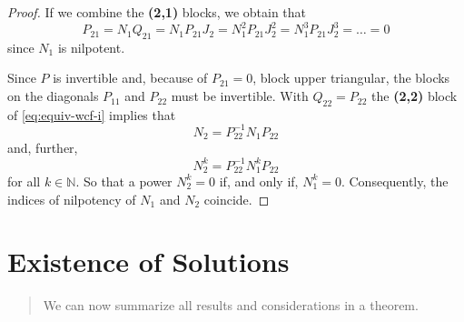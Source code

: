 \documentclass[]{book}
\newenvironment {JHSAYS} [0] {\begin{quote}\color{jhsc}} {\end{quote}}
\theoremstyle{definition}
\theoremstyle{definition}
\theoremstyle{definition}
\theoremstyle{definition}
\theoremstyle{remark}
\begin{document}
\begin{proof}
If we combine the \textbf{(2,1)} blocks, we obtain that
\[
P_{21}=N_1Q_{21}=N_1P_{21}J_2=N_1^2P_{21}J_2^2=N_1^3P_{21}J_2^3=\dotsc=0
\]
since \(N_1\) is nilpotent.

Since \(P\) is invertible and, because of \(P_{21}=0\), block upper triangular, the blocks on the diagonals \(P_{11}\) and \(P_{22}\) must be invertible. With \(Q_{22}=P_{22}\) the \textbf{(2,2)} block of \eqref{eq:equiv-wcf-i} implies that
\[
N_2 = P_{22}^{-1}N_1P_{22}
\]
and, further,
\[
N_2^k = P_{22}^{-1}N_1^kP_{22}
\]
for all \(k\in\mathbb N\). So that a power \(N_2^k=0\) if, and only if, \(N_1^k=0\). Consequently, the indices of nilpotency of \(N_1\) and \(N_2\) coincide.
\end{proof}

\hypertarget{III-ex-sols}{%
\section{Existence of Solutions}\label{III-ex-sols}}

\begin{JHSAYS}
We can now summarize all results and considerations in a theorem.
\end{JHSAYS}
\end{document}
